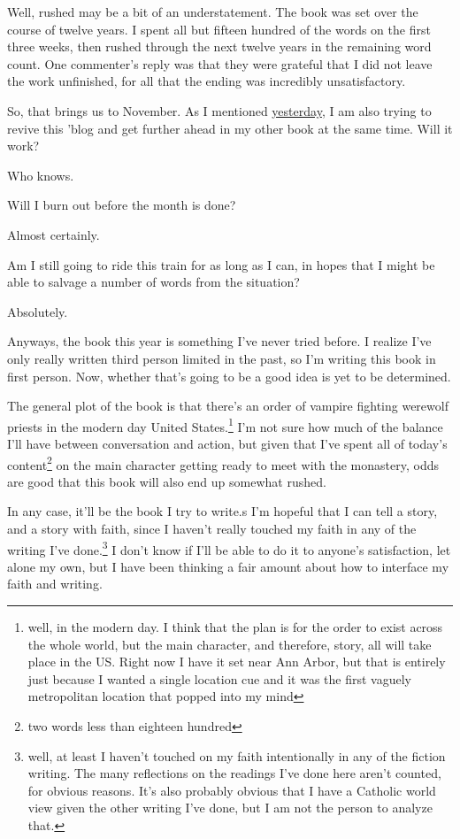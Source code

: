 \documentclass[12pt]{article}[titlepage]
\newcommand{\1}{\={a}}
\newcommand{\2}{\={e}}
\newcommand{\3}{\={\i}}
\newcommand{\4}{\=o}
\newcommand{\5}{\=u}
\newcommand{\6}{\={A}}
\renewcommand{\,}{\textsuperscript{,}}
\begin{document}
Well, rushed may be a bit of an understatement.
The book was set over the course of twelve years.
I spent all but fifteen hundred of the words on the first three weeks, then rushed through the next twelve years in the remaining word count.
One commenter's reply was that they were grateful that I did not leave the work unfinished, for all that the ending was incredibly unsatisfactory.

So, that brings us to November.
As I mentioned \href{reflection-october-23.html}{yesterday}, I am also trying to revive this 'blog and get further ahead in my other book at the same time.
Will it work?

Who knows.

Will I burn out before the month is done?

Almost certainly.

Am I still going to ride this train for as long as I can, in hopes that I might be able to salvage a number of words from the situation?

Absolutely.

Anyways, the book this year is something I've never tried before.
I realize I've only really written third person limited in the past, so I'm writing this book in first person.
Now, whether that's going to be a good idea is yet to be determined.

The general plot of the book is that there's an order of vampire fighting werewolf priests in the modern day United States.\footnote{well, in the modern day.
I think that the plan is for the order to exist across the whole world, but the main character, and therefore, story, all will take place in the US.
Right now I have it set near Ann Arbor, but that is entirely just because I wanted a single location cue and it was the first vaguely metropolitan location that popped into my mind}
I'm not sure how much of the balance I'll have between conversation and action, but given that I've spent all of today's content\footnote{two words less than eighteen hundred} on the main character getting ready to meet with the monastery, odds are good that this book will also end up somewhat rushed.

In any case, it'll be the book I try to write.s
I'm hopeful that I can tell a story, and a story with faith, since I haven't really touched my faith in any of the writing I've done.\footnote{well, at least I haven't touched on my faith intentionally in any of the fiction writing.
The many reflections on the readings I've done here aren't counted, for obvious reasons.
It's also probably obvious that I have a Catholic world view given the other writing I've done, but I am not the person to analyze that.}
I don't know if I'll be able to do it to anyone's satisfaction, let alone my own, but I have been thinking a fair amount about how to interface my faith and writing.
\end{document}
